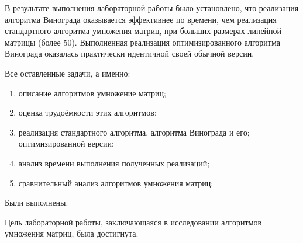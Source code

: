 
В результате выполнения лабораторной работы было установлено, что реализация алгоритма Винограда оказывается эффективнее по времени, чем реализация стандартного алгоритма умножения матриц, при больших размерах линейной матрицы (более 50). Выполненная реализация оптимизированного алгоритма Винограда оказалась практически идентичной своей обычной версии.

Все оставленные задачи, а именно:

\begin{enumerate}[label=---]
	\item описание алгоритмов умножение матриц;
	\item оценка трудоёмкости этих алгоритмов;
	\item реализация стандартного алгоритма, алгоритма Винограда и его; оптимизированной версии;
	\item анализ времени выполнения полученных реализаций;
	\item сравнительный анализ алгоритмов умножения матриц;
\end{enumerate}
Были выполнены.

Цель лабораторной работы, заключающаяся в исследовании алгоритмов умножения матриц, была достигнута.

\clearpage